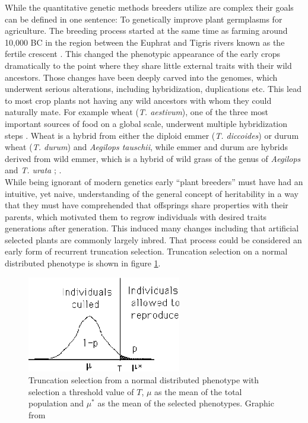 While the quantitative genetic methods breeders utilize are complex their goals can be
defined in one sentence: To genetically improve plant germplasms for agriculture. The
breeding process started at the same time as farming around 10,000 BC in the region
between the Euphrat and Tigris rivers known as the fertile crescent
\cite{kingsbury2009hybrid}. This changed the phenotypic appearance of the early crops
dramatically to the point where they share little external traits with their wild
ancestors. Those changes have been deeply carved into the genomes, which underwent serious
alterations, including hybridization, duplications etc. This lead to most crop plants not
having any wild ancestors with whom they could naturally mate. For example wheat
(\textit{T. aestivum}), one of the three most important sources of food on a global
scale, underwent multiple hybridization steps \cite{ozkan2001allopolyploidy}. Wheat is a
hybrid from either the diploid emmer (\textit{T. diccoides}) or durum wheat
(\textit{T. durum}) and \textit{{Aegilops tauschii}}, while emmer and durum are hybrids
derived from wild emmer, which is a hybrid of wild grass of the genus of \textit{Aegilops}
and \textit{T. urata} \cite{friebe2000development}; \cite{feldman2012genome}.\\
While being ignorant of modern genetics early ``plant breeders'' must have had an
intuitive, yet naive, understanding of the general concept of heritability in a way that
they must have comprehended that offsprings share properties with their parents, which
motivated them to regrow individuals with desired traits generations after
generation. This induced many changes including that artificial selected plants are
commonly largely inbred. That process could be considered an early form of recurrent
truncation selection. Truncation selection on a normal distributed phenotype is shown in
figure \ref{fig:trunSel}.
 
\begin{figure}[H]
  \centering \includegraphics[height=.25\textheight, width=0.6\textwidth]{Figures/truncSel} \decoRule
  \caption[Truncation selection of a normal distributed phenotype]{Truncation selection
    from a normal distributed phenotype with selection a threshold value of $T$, $\mu$ as
    the mean of the total population and $\mu^{\ast}$ as the mean of the selected
    phenotypes. Graphic from \cite{walsh2018short}}
 \label{fig:trunSel}
\end{figure}

